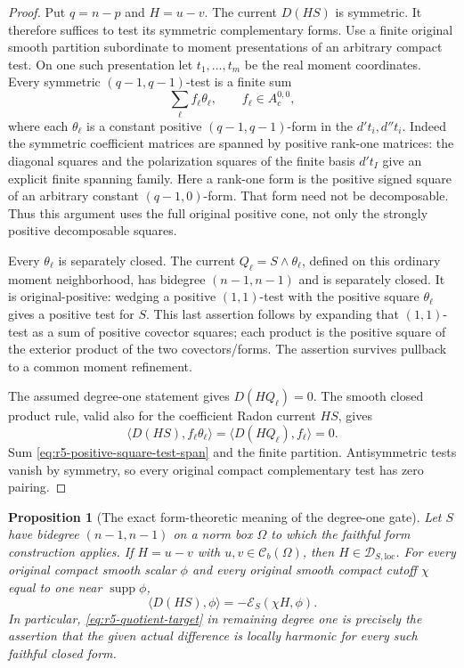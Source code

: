 \documentclass[11pt,a4paper]{article}
\numberwithin{equation}{section}
\newtheorem{proposition}[theorem]{Proposition}
\theoremstyle{definition}
\theoremstyle{remark}
\begin{document}
\begin{proof}
Put $q=n-p$ and $H=u-v$. The current $D(HS)$ is symmetric.
It therefore suffices to test its symmetric complementary forms.
Use a finite original smooth partition subordinate to moment
presentations of an arbitrary compact test. On one such
presentation let $t_1,\ldots,t_m$ be the real moment coordinates.
Every symmetric $(q-1,q-1)$-test is a finite sum
\begin{equation}\label{eq:r5-positive-square-test-span}
 \sum_\ell f_\ell\theta_\ell,
 \qquad f_\ell\in A_c^{0,0},
\end{equation}
where each $\theta_\ell$ is a constant positive
$(q-1,q-1)$-form in the $d't_i,d''t_i$. Indeed the symmetric
coefficient matrices are spanned by positive rank-one matrices:
the diagonal squares and the polarization squares of the finite
basis $d't_I$ give an explicit finite spanning family. Here a
rank-one form is the positive signed square of an arbitrary
constant $(q-1,0)$-form. That form need not be decomposable.
Thus this argument uses the full original positive cone, not
only the strongly positive decomposable squares.

Every $\theta_\ell$ is separately closed. The current
$Q_\ell=S\wedge\theta_\ell$, defined on this ordinary moment
neighborhood, has bidegree $(n-1,n-1)$ and is separately closed.
It is original-positive: wedging a positive $(1,1)$-test with
the positive square $\theta_\ell$ gives a positive test for $S$.
This last assertion follows by expanding that $(1,1)$-test as
a sum of positive covector squares; each product is the positive
square of the exterior product of the two covectors/forms.
The assertion survives pullback to a common moment refinement.

The assumed degree-one statement gives $D(HQ_\ell)=0$.
The smooth closed product rule, valid also for the coefficient
Radon current $HS$, gives
\[
 \langle D(HS),f_\ell\theta_\ell\rangle
       =\langle D(HQ_\ell),f_\ell\rangle=0.
\]
Sum \eqref{eq:r5-positive-square-test-span} and the finite
partition. Antisymmetric tests vanish by symmetry, so every
original compact complementary test has zero pairing.
\end{proof}

\begin{proposition}[The exact form-theoretic meaning of the degree-one gate]
\label{prop:r5-quotient-form-gate}
Let $S$ have bidegree $(n-1,n-1)$ on a norm box $\Omega$ to
which the faithful form construction applies. If
$H=u-v$ with $u,v\in\mathcal C_b(\Omega)$, then
$H\in\mathscr D_{S,\mathrm{loc}}$. For every original compact
smooth scalar $\phi$ and every original smooth compact cutoff
$\chi$ equal to one near $\operatorname{supp}\phi$,
\begin{equation}\label{eq:r5-defect-energy-duality}
 \langle D(HS),\phi\rangle
       =-\mathcal E_S(\chi H,\phi).
\end{equation}
In particular, \eqref{eq:r5-quotient-target} in remaining degree
one is precisely the assertion that the given actual difference
is locally harmonic for every such faithful closed form.
\end{proposition}
\end{document}
